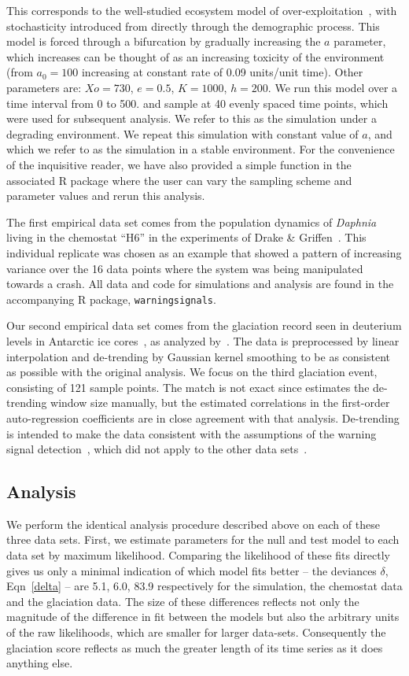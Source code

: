 \documentclass[authoryear,review,11pt]{elsarticle}
\begin{document}
This corresponds to the well-studied ecosystem model of over-exploitation~\citep{Noy-Meir1975, May1977}, 
with stochasticity introduced from directly through the demographic process.   
This model is forced through a bifurcation by gradually increasing the $a$ parameter,
which increases can be thought of as an increasing toxicity of the environment
(from $a_0 = 100$ increasing at constant rate of 0.09 units/unit time).  
Other parameters are: $Xo = 730$, $e = 0.5$, $K = 1000$, $h = 200$.  
We run this model over a time interval from 0 to 500.  
and sample at 40 evenly spaced time points, which were used for subsequent analysis.
We refer to this as the simulation under a degrading environment.
We repeat this simulation with constant value of $a$, and which we refer to as the simulation in a stable environment.  
For the convenience of the inquisitive reader, we have also provided a simple function in the 
associated R package where the user can vary the sampling scheme and parameter values and rerun this analysis.  

The first empirical data set comes from the population dynamics of 
\emph{Daphnia} living in the chemostat ``H6'' in the experiments of Drake \& Griffen~\citep{Drake2010}. 
This individual replicate was chosen as an example that showed 
a pattern of increasing variance over the 16 data points where the system was being manipulated towards a crash.
All data and code for simulations and analysis are found in the accompanying R package, \verb|warningsignals|.  

Our second empirical data set comes from the glaciation record seen in deuterium levels in Antarctic ice cores~\citep{Petit1999}, 
as analyzed by~\citet{Dakos2008}.
The data is preprocessed by linear interpolation and de-trending by Gaussian kernel smoothing 
to be as consistent as possible with the original analysis.
We focus on the third glaciation event, consisting of 121 sample points. 
The match is not exact since estimates the de-trending window size manually,
but the estimated correlations in the first-order auto-regression coefficients are in close agreement with that analysis. 
De-trending is intended to make the data consistent with the assumptions of the warning signal detection~\citep{Dakos2008}, 
which did not apply to the other data sets~\citep{Drake2010}.  

\subsection*{Analysis}
We perform the identical analysis procedure described above on each of these three data sets.
First, we estimate parameters for the null and test model to each data set by maximum likelihood.
Comparing the likelihood of these fits directly gives us only a minimal indication of which model fits better --
the deviances $\delta$, Eqn~\eqref{delta} -- are 5.1, 6.0, 83.9 respectively for the simulation,
the chemostat data and the glaciation data. 
The size of these differences reflects not only the magnitude of the difference in fit
between the models but also the arbitrary units of the raw likelihoods,
which are smaller for larger data-sets.  
Consequently the glaciation score reflects as much the greater length of its time series as it does anything else.  
\end{document}

